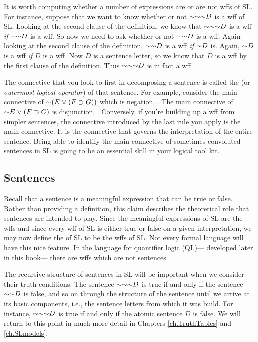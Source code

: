 It is worth computing whether a number of expressions are or are not wffs of SL.
For instance, suppose that we want to know whether or not $\enot \enot \enot D$ is a wff of SL.
Looking at the second clause of the definition, we know that $\enot \enot \enot D$ is a wff \emph{if} $\enot \enot D$ is a wff.
So now we need to ask whether or not $\enot \enot D$ is a wff.
Again looking at the second clause of the definition, $\enot \enot D$ is a wff \emph{if} $\enot D$ is.
Again, $\enot D$ is a wff \emph{if} $D$ is a wff.
Now $D$ is a sentence letter, so we know that $D$ is a wff by the first clause of the definition.
Thus $\enot \enot \enot D$ is in fact a wff. 

The connective that you look to first in decomposing a sentence is called the  (or \emph{outermost logical operator}) of that sentence.
For example, consider the main connective of $\enot (E \eor (F \eif G))$ which is negation, \enot.
The main connective of $\enot E \eor (F \eif G)$ is disjunction, \eor.
Conversely, if you're building up a wff from simpler sentences, the connective introduced by the last rule you apply is the main connective.
It is the connective that governs the interpretation of the entire sentence.
Being able to identify the main connective of sometimes convoluted sentences in SL is going to be an essential skill in your logical tool kit.





\subsection{Sentences}

Recall that a sentence is a meaningful expression that can be true or false.
Rather than providing a definition, this claim describes the theoretical role that sentences are intended to play.
Since the meaningful expressions of SL are the wffs and since every wff of SL is either true or false on a given interpretation, we may now define the  of SL to be the wffs of SL.
Not every formal language will have this nice feature.
In the language for quantifier logic (QL)--- developed later in this book--- there are wffs which are not sentences.

The recursive structure of sentences in SL will be important when we consider their truth-conditions.
The sentence $\enot \enot \enot D$ is true if and only if the sentence $\enot \enot D$ is false, and so on through the structure of the sentence until we arrive at its basic components, i.e., the sentence letters from which it was build.
For instance, $\enot \enot \enot D$ is true if and only if the atomic sentence $D$ is false.
We will return to this point in much more detail in Chapters \ref{ch.TruthTables} and \ref{ch.SLmodels}.






